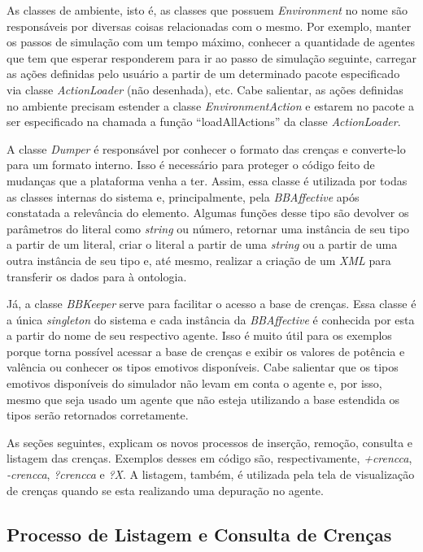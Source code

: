 As classes de ambiente, isto é, as classes que possuem \emph{Environment} no
nome são responsáveis por diversas coisas relacionadas com o mesmo. Por
exemplo, manter os passos de simulação com um tempo máximo, conhecer a
quantidade de agentes que tem que esperar responderem para ir ao passo de
simulação seguinte, carregar as ações definidas pelo usuário a partir de um
determinado pacote especificado via classe \emph{ActionLoader} (não
desenhada), etc. Cabe salientar, as ações definidas no ambiente precisam
estender a classe \emph{EnvironmentAction} e estarem no pacote a ser
especificado na chamada a função ``loadAllActions'' da classe \emph{ActionLoader}.

A classe \emph{Dumper} é responsável por conhecer o formato das crenças \jason
e converte-lo para um formato interno. Isso é necessário para proteger o
código feito de mudanças que a plataforma venha a ter. Assim, essa classe é
utilizada por todas as classes internas do sistema e, principalmente, pela
\emph{BBAffective} após constatada a relevância do elemento. Algumas funções
desse tipo são devolver os parâmetros do literal como \emph{string} ou número,
retornar uma instância de seu tipo a partir de um literal, criar o literal a
partir de uma \emph{string} ou a partir de uma outra instância de seu tipo e,
até mesmo, realizar a criação de um \emph{XML} para transferir os dados para
à ontologia.

Já, a classe \emph{BBKeeper} serve para facilitar o acesso a base de crenças.
Essa classe é a única \emph{singleton} do sistema e cada instância da
\emph{BBAffective} é conhecida por esta a partir do nome de seu respectivo
agente. Isso é muito útil para os exemplos porque torna possível acessar a
base de crenças e exibir os valores de potência e valência ou conhecer os
tipos emotivos disponíveis. Cabe salientar que os tipos emotivos disponíveis
do simulador não levam em conta o agente e, por isso, mesmo que seja usado um
agente que não esteja utilizando a base estendida os tipos serão retornados
corretamente.

As seções seguintes, explicam os novos processos de inserção, remoção,
consulta e listagem das crenças. Exemplos desses em código \jason são,
respectivamente, \emph{+crencca}, \emph{-crencca}, \emph{?crencca} e
\emph{?X}. A listagem, também, é utilizada pela tela de visualização de
crenças quando se esta realizando uma depuração no agente.

\subsection{Processo de Listagem e Consulta de Crenças}

